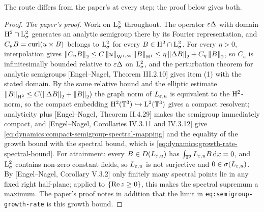 The route differs from the paper's at every step; the proof below gives both.

\begin{proof}
  \leanok
  \emph{The paper's proof.}  Work on $\mathrm{L}^2_\sigma $ throughout.  The operator $\varepsilon\Delta $
  with domain $\mathrm{H}^2\cap\mathrm{L}^2_\sigma $ generates an analytic semigroup there by its Fourier
  representation, and $C_uB=\operatorname{curl}(u\times B) $ belongs to $\mathrm{L}^2_\sigma $ for every
  $B\in\mathrm{H}^2\cap\mathrm{L}^2_\sigma $.  For every $\eta>0 $, interpolation gives
  $\left\|C_uB\right\|_2\leq C\left\|u\right\|_{\mathrm{W}^{1,\infty}}\left\|B\right\|_{\mathrm{H}^1}\leq\eta\left\|\Delta B\right\|_2+C_\eta\left\|B\right\|_2 $,
  so $C_u $ is infinitesimally bounded relative to $\varepsilon\Delta $ on $\mathrm{L}^2_\sigma $, and the
  perturbation theorem for analytic semigroups [Engel--Nagel, Theorem III.2.10] gives item
  (1) with the stated domain.  By the same relative bound and the elliptic estimate
  $\left\|B\right\|_{\mathrm{H}^2}\leq C(\left\|\Delta B\right\|_2+\left\|B\right\|_2) $ the graph norm of $L_{\varepsilon,u} $ is
  equivalent to the $\mathrm{H}^2 $-norm, so the compact embedding
  $\mathrm{H}^2(\mathbb{T}^3)\hookrightarrow\mathrm{L}^2(\mathbb{T}^3) $ gives a compact resolvent; analyticity plus
  [Engel--Nagel, Theorem II.4.29] makes the semigroup immediately compact, and
  [Engel--Nagel, Corollaries IV.3.11 and IV.3.12] give
  \eqref{eq:dynamics:compact-semigroup-spectral-mapping} and the equality of the growth
  bound with the spectral bound, which is
  \eqref{eq:dynamics:growth-rate-spectral-bound}.  For attainment: every
  $B\in D(L_{\varepsilon,u}) $ has $\int_{\mathbb{T}^3}L_{\varepsilon,u}B\,\mathrm{d} x=0 $, and $\mathrm{L}^2_\sigma $ contains
  non-zero constant fields, so $L_{\varepsilon,u} $ is not surjective and $0\in\sigma(L_{\varepsilon,u}) $.
  By [Engel--Nagel, Corollary V.3.2] only finitely many spectral points lie in any fixed
  right half-plane; applied to $\{\operatorname{Re} z\geq0\} $, this makes the spectral supremum a maximum.
  The paper's proof notes in addition that the limit in \texttt{eq:semigroup-growth-rate} is
  this growth bound.


\end{proof}
